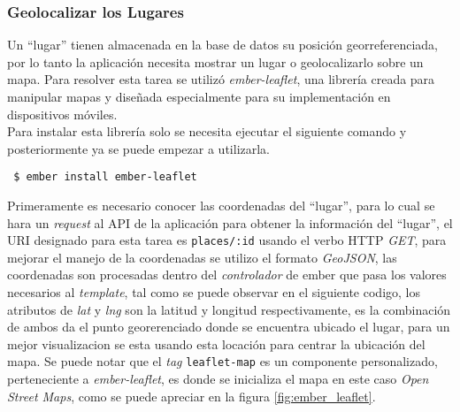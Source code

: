


\subsubsection{Geolocalizar los Lugares}
\label{sub:fronted_lugares}



Un ``lugar'' tienen almacenada en la base de datos su posición georreferenciada, por lo tanto la aplicación necesita mostrar un lugar o geolocalizarlo sobre un mapa. Para resolver esta tarea se utilizó \emph{ember-leaflet}, una librería creada para manipular mapas y diseñada especialmente  para su implementación en dispositivos móviles.\\

Para instalar esta librería solo se necesita ejecutar el siguiente comando y posteriormente ya se puede empezar a utilizarla.\\

\begin{verbatim}
 $ ember install ember-leaflet
\end{verbatim}


Primeramente es necesario conocer las coordenadas del ``lugar'', para lo cual se hara un \emph{request} al API de la aplicación para obtener la información del ``lugar'', el URI designado para esta tarea es \verb|places/:id| usando el verbo HTTP \emph{GET}, para mejorar el manejo de la coordenadas se utilizo el formato \emph{GeoJSON}, las coordenadas son procesadas dentro del \emph{controlador} de ember que pasa los valores necesarios al \emph{template}, tal como se puede observar en el siguiente codigo, los atributos de \emph{lat} y \emph{lng} son la latitud y longitud respectivamente, es la combinación de ambos da el punto georerenciado donde se encuentra ubicado el lugar, para un mejor visualizacion se esta usando esta locación para centrar la ubicación del  mapa. Se puede notar que el \emph{tag} \verb|leaflet-map| es un componente personalizado, perteneciente a \emph{ember-leaflet}, es donde se inicializa el mapa en este caso \emph{Open Street Maps}, como se puede apreciar en la figura \ref{fig:ember_leaflet}.



